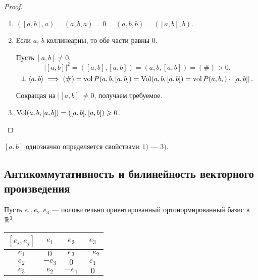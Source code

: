 \begin{proof}~
    \begin{enumerate}
    \item $([a, b], a) = (a, b, a) = 0 = (a, b, b) = ([a, b], b)$.
    \item Если $a$, $b$ коллинеарны, то обе части равны 0.

        Пусть $[a, b] \neq 0$.
        \begin{equation*}
            \left|[a, b]\right|^2 = ([a, b], [a, b]) = (a, b, [a, b]) = (\#) > 0
        .\end{equation*}
        \begin{equation*}
            [a, b] \perp \left< a, b \right> \implies (\#) = \vol P(a, b, [a, b]) = \Vol(a, b, [a, b]) = \vol P(a, b,) \cdot \left|[a, b]\right|
        .\end{equation*}

        Сокращая на $|[a, b]| \neq 0$, получаем требуемое.

    \item
        $\operatorname{\mathop{\mathrm{Vol}}} (a, b, [a, b]) = ([a, b], [a, b]) \geqslant 0$.
        \qedhere
    \end{enumerate}
\end{proof}

\begin{exercise}
    $[a, b]$ однозначно определяется свойствами $1)$ --- $3)$.
\end{exercise}

\subsection{Антикоммутативность и билинейность векторного произведения}

\begin{example}
    Пусть $e_1, e_2, e_3$ --- положительно ориентированный ортонормированный базис в $\mathbb{R}^3$.
    \begin{table}[h]
        \centering
        \begin{tabular}{c|c|c|c|}
            $[e_i, e_j]$ & $e_1$ & $e_2$ & $e_3$ \\ \hline
            $e_1$ & $0$ & $e_3$ & $-e_2$ \\ \hline
            $e_2$ & $-e_3$ & $0$ & $e_1$ \\ \hline
            $e_3$ & $e_2$ & $-e_1$ & $0$ \\ \hline
        \end{tabular}
    \end{table}
\end{example}

